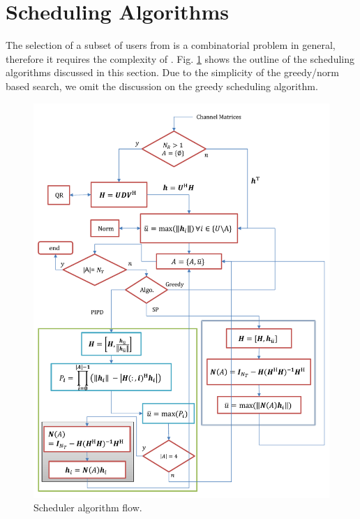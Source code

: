 \documentclass[conference,letterpaper,10pt]{./../../IEEE/IEEEtran}
\begin{document}
\section{Scheduling Algorithms}
\label{sec:sched_discussions}
The selection of a subset of users  from  is a combinatorial problem in general, therefore it requires the complexity of . Fig. \ref{kuva:scheduler_block_diag} shows the outline of the scheduling algorithms discussed in this section. Due to the simplicity of the greedy/norm based search, we omit the discussion on the greedy scheduling algorithm.
\begin{figure}
	\centering
	\includegraphics[trim=0in 0.25in 0in 0.5in,width=\columnwidth, angle=0]{system_model}
	\caption{Scheduler algorithm flow.}
	\label{kuva:scheduler_block_diag}
\end{figure}
\end{document}
